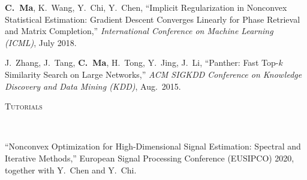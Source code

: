 \documentclass[a4paper, 10pt]{article}
\newenvironment{changemargin}[2]{%
  \begin{list}{}{%
    \setlength{\topsep}{0pt}%
    \setlength{\leftmargin}{#1}%
    \setlength{\rightmargin}{#2}%
    \setlength{\listparindent}{\parindent}%
    \setlength{\itemindent}{\parindent}%
    \setlength{\parsep}{\parskip}%
  }%
  \item[]}{\end{list}
}
\newcommand{\lineover}{
	\begin{changemargin}{-0.05in}{-0.05in}
		\vspace*{-8pt}
		\hrulefill \\
		\vspace*{-2pt}
	\end{changemargin}
}
\newcommand{\header}[1]{
	\begin{changemargin}{-0.5in}{-0.5in}
		\scshape{#1}\\
  	\lineover
	\end{changemargin}
}
\newenvironment{body} {
	\vspace*{-16pt}
	\begin{changemargin}{-0.3in}{-0.5in}
  }	
	{\end{changemargin}
}
\begin{document}
\begin{body}
\begin{enumerate}[label={[{C}{{\arabic*}}]}]
	\item 
	\textbf{C.~Ma}, K.~Wang, Y.~Chi, Y.~Chen, {{``Implicit Regularization in Nonconvex Statistical Estimation: Gradient Descent Converges Linearly for Phase Retrieval and Matrix Completion,''}} \emph{International Conference on Machine Learning (ICML)}, July 2018. \\
	
	\item J.~Zhang, J.~Tang, \textbf{C.~Ma}, H.~Tong, Y.~Jing, J.~Li, {{``Panther: Fast Top-$k$ Similarity Search on Large Networks,''}} \emph{ACM SIGKDD Conference on Knowledge Discovery and Data Mining (KDD)}, Aug.~2015.\\
	
	
	\end{enumerate}
\end{body}


\bigskip
\header{\LARGE{Tutorials}}
\begin{body}

\vspace{18pt}
\begin{enumerate}[label={[{Tut}{{\arabic*}}]}]
\item  {``Nonconvex Optimization for High-Dimensional Signal Estimation: Spectral and Iterative Methods,''} European Signal Processing Conference (EUSIPCO) 2020, together with Y.~Chen and Y.~Chi.
\end{enumerate}

\end{body}
\end{document}

